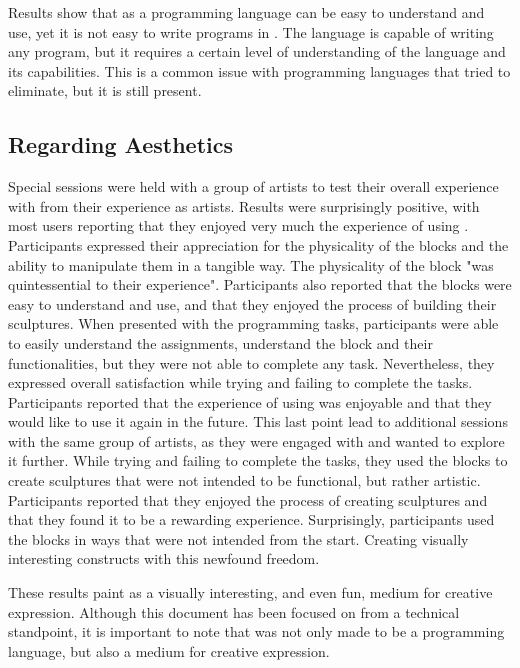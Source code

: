 Results show that \sculpt as a programming language can be easy to understand and use, yet it is not easy to write programs in \sculpt.
The language is capable of writing any program, but it requires a certain level of understanding of the language and its capabilities.
This is a common issue with programming languages that \sculpt tried to eliminate, but it is still present.

\subsection{Regarding Aesthetics}
\label{sec:results:validation:aesthetics}
Special sessions were held with a group of artists to test their overall experience with \sculpt from their experience as artists.
Results were surprisingly positive, with most users reporting that they enjoyed very much the experience of using \sculpt.
Participants expressed their appreciation for the physicality of the blocks and the ability to manipulate them in a tangible way.
The physicality of the block "was quintessential to their experience".
Participants also reported that the blocks were easy to understand and use, and that they enjoyed the process of building their sculptures.
When presented with the programming tasks, participants were able to easily understand the assignments, understand the block and their functionalities, but they were not able to complete any task.
Nevertheless, they expressed overall satisfaction while trying and failing to complete the tasks.
Participants reported that the experience of using \sculpt was enjoyable and that they would like to use it again in the future.
This last point lead to additional sessions with the same group of artists, as they were engaged with \sculpt and wanted to explore it further.
While trying and failing to complete the tasks, they used the blocks to create sculptures that were not intended to be functional, but rather artistic.
Participants reported that they enjoyed the process of creating sculptures and that they found it to be a rewarding experience.
Surprisingly, participants used the blocks in ways that were not intended from the start. Creating visually interesting constructs with this newfound freedom.

These results paint \sculpt as a visually interesting, and even fun, medium for creative expression.
Although this document has been focused on \sculpt from a technical standpoint, it is important to note that \sculpt was not only made to be a programming language, but also a medium for creative expression.
\endinput